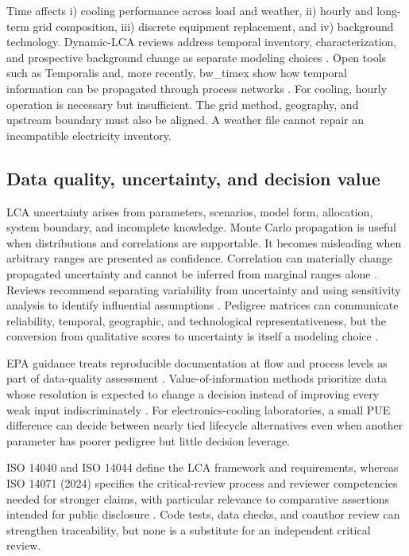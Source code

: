 \documentclass[review,a4paper,fleqn]{cas-sc}
\begin{document}
Time affects i) cooling performance across load and weather, ii) hourly and long-term grid composition, iii) discrete equipment replacement, and iv) background technology. Dynamic-LCA reviews address temporal inventory, characterization, and prospective background change as separate modeling choices \cite{ref25,ref26}. Open tools such as Temporalis and, more recently, bw\_timex show how temporal information can be propagated through process networks \cite{ref27,ref28,ref29}. For cooling, hourly operation is necessary but insufficient. The grid method, geography, and upstream boundary must also be aligned. A weather file cannot repair an incompatible electricity inventory.

\subsection{Data quality, uncertainty, and decision value}
LCA uncertainty arises from parameters, scenarios, model form, allocation, system boundary, and incomplete knowledge. Monte Carlo propagation is useful when distributions and correlations are supportable. It becomes misleading when arbitrary ranges are presented as confidence. Correlation can materially change propagated uncertainty and cannot be inferred from marginal ranges alone \cite{ref30}. Reviews recommend separating variability from uncertainty and using sensitivity analysis to identify influential assumptions \cite{ref31}. Pedigree matrices can communicate reliability, temporal, geographic, and technological representativeness, but the conversion from qualitative scores to uncertainty is itself a modeling choice \cite{ref32,ref33}.

EPA guidance treats reproducible documentation at flow and process levels as part of data-quality assessment \cite{ref33}. Value-of-information methods prioritize data whose resolution is expected to change a decision instead of improving every weak input indiscriminately \cite{ref34}. For electronics-cooling laboratories, a small PUE difference can decide between nearly tied lifecycle alternatives even when another parameter has poorer pedigree but little decision leverage.

ISO 14040 and ISO 14044 define the LCA framework and requirements, whereas ISO 14071 (2024) specifies the critical-review process and reviewer competencies needed for stronger claims, with particular relevance to comparative assertions intended for public disclosure \cite{ref35,ref36}. Code tests, data checks, and coauthor review can strengthen traceability, but none is a substitute for an independent critical review.
\end{document}

